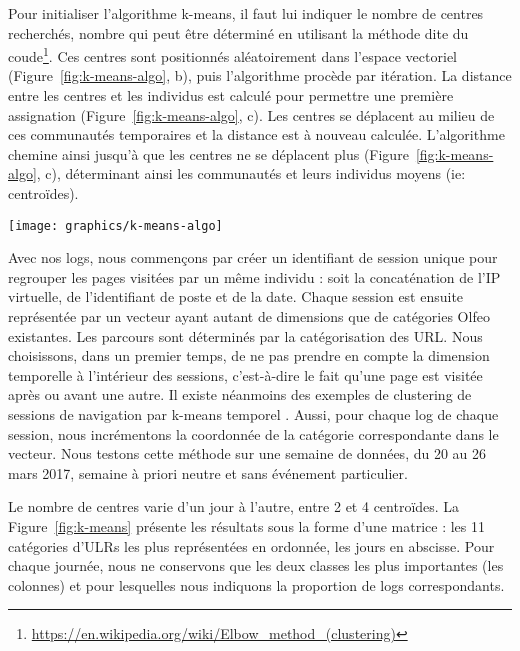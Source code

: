 \documentclass[symmetric,justified,marginals=raggedouter]{tufte-book}
\begin{document}
Pour initialiser l'algorithme k-means, il faut lui indiquer le nombre de centres recherchés, nombre qui peut être déterminé en utilisant la méthode dite du coude\footnote{\RaggedOuter \url{https://en.wikipedia.org/wiki/Elbow\_method\_(clustering)}}. Ces centres sont positionnés aléatoirement dans l'espace vectoriel (Figure~\ref{fig:k-means-algo}, b), puis l'algorithme procède par itération. La distance entre les centres et les individus est calculé pour permettre une première assignation (Figure~\ref{fig:k-means-algo}, c). Les centres se déplacent au milieu de ces communautés temporaires et la distance est à nouveau calculée. L'algorithme chemine ainsi jusqu'à que les centres ne se déplacent plus (Figure~\ref{fig:k-means-algo}, c), déterminant ainsi les communautés et leurs individus moyens (ie: centroïdes).

\begin{figure*}
  \texttt{[image: graphics/k-means-algo]}
  \caption{Exemple de fonctionnement de l'algorithme k-means avec 2 centres (bleu et rouge)}
  \label{fig:k-means-algo}
\end{figure*}

Avec nos logs, nous commençons par créer un identifiant de session unique pour regrouper les pages visitées par un même individu : soit la concaténation de l'IP virtuelle, de l'identifiant de poste et de la date. Chaque session est ensuite représentée par un vecteur ayant autant de dimensions que de catégories Olfeo existantes. Les parcours sont déterminés par la catégorisation des URL. Nous choisissons, dans un premier temps, de ne pas prendre en compte la dimension temporelle à l'intérieur des sessions, c'est-à-dire le fait qu'une page est visitée après ou avant une autre. Il existe néanmoins des exemples de clustering de sessions de navigation par k-means temporel \citep{stevanovic_unsupervised_2011}. Aussi, pour chaque log de chaque session, nous incrémentons la coordonnée de la catégorie correspondante dans le vecteur. Nous testons cette méthode sur une semaine de données, du 20 au 26 mars 2017, semaine à priori neutre et sans événement particulier. 

Le nombre de centres varie d'un jour à l'autre, entre 2 et 4 centroïdes. La Figure~\ref{fig:k-means} présente les résultats sous la forme d'une matrice : les 11 catégories d'ULRs les plus représentées en ordonnée, les jours en abscisse. Pour chaque journée, nous ne conservons que les deux classes les plus importantes (les colonnes) et pour lesquelles nous indiquons la proportion de logs correspondants. 
\end{document}
